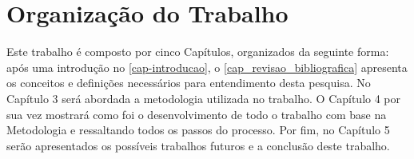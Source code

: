 \section{Organização do Trabalho}

Este trabalho é composto por cinco Capítulos, organizados da seguinte forma: após uma introdução no \autoref{cap-introducao}, o \autoref{cap_revisao_bibliografica} apresenta os conceitos e definições necessários para entendimento desta pesquisa. No Capítulo 3 será abordada a metodologia utilizada no trabalho. O Capítulo 4 por sua vez mostrará como foi o desenvolvimento de todo o trabalho com base na Metodologia e ressaltando todos os passos do processo. Por fim, no Capítulo 5 serão apresentados os possíveis trabalhos futuros e a conclusão deste trabalho.





